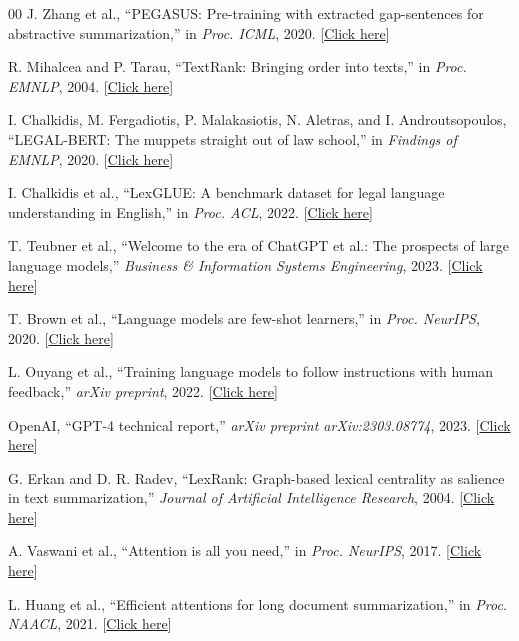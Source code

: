 \documentclass[11pt, a4paper]{article}
\theoremstyle{plain}%
\theoremstyle{remark}%
\theoremstyle{definition}%
\begin{document}
\begin{thebibliography}{00}
J. Zhang et al.,
``PEGASUS: Pre-training with extracted gap-sentences for abstractive summarization,''
in \emph{Proc. ICML}, 2020.
[\href{https://arxiv.org/abs/1912.08777}{Click here}]

R. Mihalcea and P. Tarau,
``TextRank: Bringing order into texts,''
in \emph{Proc. EMNLP}, 2004.
[\href{https://web.eecs.umich.edu/~mihalcea/papers/mihalcea.emnlp04.pdf}{Click here}]

I. Chalkidis, M. Fergadiotis, P. Malakasiotis, N. Aletras, and I. Androutsopoulos,
``LEGAL-BERT: The muppets straight out of law school,''
in \emph{Findings of EMNLP}, 2020.
[\href{https://aclanthology.org/2020.findings-emnlp.261/}{Click here}]

I. Chalkidis et al.,
``LexGLUE: A benchmark dataset for legal language understanding in English,''
in \emph{Proc. ACL}, 2022.
[\href{https://aclanthology.org/2022.acl-long.297/}{Click here}]

T. Teubner et al.,
``Welcome to the era of ChatGPT et al.: The prospects of large language models,''
\emph{Business \& Information Systems Engineering}, 2023.
[\href{https://publikationen.bibliothek.kit.edu/1000160856}{Click here}]

T. Brown et al.,
``Language models are few-shot learners,''
in \emph{Proc. NeurIPS}, 2020.
[\href{https://arxiv.org/abs/2005.14165}{Click here}]

L. Ouyang et al.,
``Training language models to follow instructions with human feedback,''
\emph{arXiv preprint}, 2022.
[\href{https://arxiv.org/abs/2203.02155}{Click here}]

OpenAI,
``GPT-4 technical report,''
\emph{arXiv preprint arXiv:2303.08774}, 2023.
[\href{https://arxiv.org/abs/2303.08774}{Click here}]

G. Erkan and D. R. Radev,
``LexRank: Graph-based lexical centrality as salience in text summarization,''
\emph{Journal of Artificial Intelligence Research}, 2004.
[\href{https://arxiv.org/abs/1109.2128}{Click here}]

A. Vaswani et al.,
``Attention is all you need,''
in \emph{Proc. NeurIPS}, 2017.
[\href{https://arxiv.org/abs/1706.03762}{Click here}]

L. Huang et al.,
``Efficient attentions for long document summarization,''
in \emph{Proc. NAACL}, 2021.
[\href{https://aclanthology.org/2021.naacl-main.112/}{Click here}]


\end{thebibliography}
\end{document}

